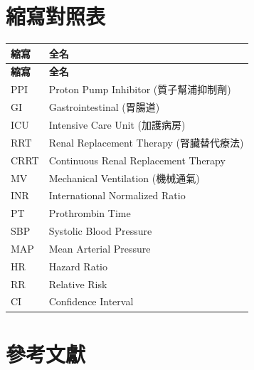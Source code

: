\documentclass[12pt,a4paper]{article}
\begin{document}
\section{縮寫對照表}

\begin{longtable}{p{3cm}p{11cm}}
\toprule
\textbf{縮寫} & \textbf{全名} \\
\midrule
\endfirsthead

\toprule
\textbf{縮寫} & \textbf{全名} \\
\midrule
\endhead

\bottomrule
\endfoot

PPI & Proton Pump Inhibitor (質子幫浦抑制劑) \\
GI & Gastrointestinal (胃腸道) \\
ICU & Intensive Care Unit (加護病房) \\
RRT & Renal Replacement Therapy (腎臟替代療法) \\
CRRT & Continuous Renal Replacement Therapy \\
MV & Mechanical Ventilation (機械通氣) \\
INR & International Normalized Ratio \\
PT & Prothrombin Time \\
SBP & Systolic Blood Pressure \\
MAP & Mean Arterial Pressure \\
HR & Hazard Ratio \\
RR & Relative Risk \\
CI & Confidence Interval \\
\bottomrule
\end{longtable}

\section{參考文獻}
\end{document}
